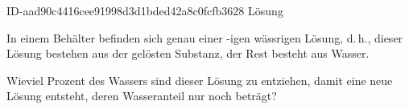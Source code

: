 \begin{exercise}
      {ID-aad90c4416cee91998d3d1bded42a8c0fcfb3628}
      {Lösung}
  \ifproblem\problem\par
    In einem Behälter befinden sich genau  einer -igen wässrigen
    Lösung, d.\,h.,  dieser Lösung bestehen aus der gelösten Substanz,
    der Rest besteht aus Wasser.\par
    Wieviel Prozent des Wassers sind dieser Lösung zu entziehen, damit eine
    neue Lösung entsteht, deren Wasseranteil nur noch  beträgt?
  \fi
\end{exercise}
